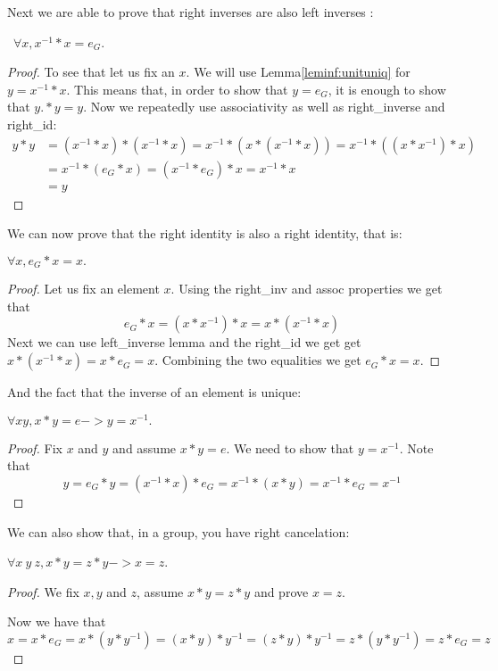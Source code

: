 Next we are able to prove that right inverses are also left inverses :
\begin{lemma} ~$\forall x, x^{-1} * x =e_{G}.$
\end{lemma}
\begin{proof}
To see that let us fix an $x$. We will use Lemma\ref{leminf:unituniq} for $y=x^{-1}* x$. This means that, in order to show that $y=e_{G}$,  it is enough to show that $y.* y= y$. Now  we repeatedly use associativity as well as right\_inverse and right\_id:
\begin{align*}
y* y & =  (x^{-1}* x)*(x^{-1}*x )= x^{-1}* (x* (x^{-1}*x )) =x^{-1}*(( x* x^{-1})* x ) \\ & = x^{-1}* (e_{G}* x)=(x^{-1}* e_{G})* x= x^{-1}*x \\ & =  y
\end{align*}
\end{proof}

We can now prove that the right identity is also a right identity, that is:

\begin{lemma}[left\_id]$\forall x, e_{G}*x =x.$
\end{lemma}
\begin{proof}
Let us fix an element $x$. Using the right\_inv and assoc  properties we get that $$e_{G}* x= (x* x^{-1})*x= x* (x^{-1}*x)$$
Next we can use left\_inverse lemma and the right\_id we get  get  $x*(x^{-1}*x)= x* e_{G}=x$. Combining the two equalities we get
$e_{G}* x= x$.
\end{proof}

And the fact that the inverse of an element is unique:
\begin{lemma} $\forall x y, x*y = e-> y = x^{-1}.$
\end{lemma}
\begin{proof}
Fix $x $ and $y$ and assume $x*y = e$. We need to show that $y=x^{-1}$.
Note that
$$ y =e_{G} * y = (x^{-1}* x)* e_{G}= x^{-1}*(x*y) = x^{-1}* e_{G}= x^{-1} $$

\end{proof}


We can also show that, in a group, you have right cancelation:

\begin{lemma} $\forall x\  y\  z, x*y= z*y-> x=z.$\
\end{lemma}
\begin{proof}
We fix $x, y$ and $z$,  assume $x*y= z*y$ and prove $x=z$.

Now we have that
$$ x = x*e_{G}= x* (y * y^{-1})=(x*y)* y^{-1}= (z*y)*y^{-1}= z*( y* y^{-1}) = z*e_{G}= z $$
\end{proof}

